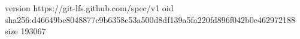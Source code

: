 version https://git-lfs.github.com/spec/v1
oid sha256:d46649bc8048877c9b6358c53a500d8df139a5fa220fd896f042b0e462972188
size 193067
